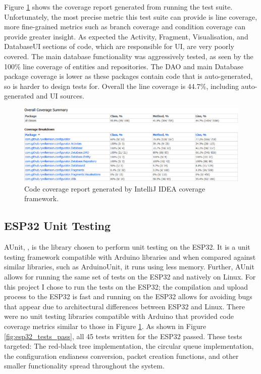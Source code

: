 \documentclass{l4proj}
\begin{document}
Figure \ref{fig:android_coverage} shows the coverage report generated from running the test suite. Unfortunately, the most precise metric this test suite can provide is line coverage, more fine-grained metrics such as branch coverage and condition coverage can provide greater insight. As expected the Activity, Fragment, Visualisation, and DatabaseUI sections of code, which are responsible for UI, are very poorly covered. The main database functionality was aggressively tested, as seen by the 100\% line coverage of entities and repositories. The DAO and main Database package coverage is lower as these packages contain code that is auto-generated, so is harder to design tests for. Overall the line coverage is 44.7\%, including auto-generated and UI sources.

\begin{figure}[!htb]
    \centering
    \includegraphics[width=1.0\linewidth]{images/android-code-coverage.png}

    \caption{ Code coverage report generated by IntelliJ IDEA coverage framework. }

    \label{fig:android_coverage}
\end{figure}

\subsection{ESP32 Unit Testing}

AUnit, \citep{park_bxparksaunit_2021}, is the library chosen to perform unit testing on the ESP32. It is a unit testing framework compatible with Arduino libraries and when compared against similar libraries, such as ArduinoUnit, it runs using less memory. Further, AUnit allows for running the same set of tests on the ESP32 and natively on Linux. For this project I chose to run the tests on the ESP32; the compilation and upload process to the ESP32 is fast and running on the ESP32 allows for avoiding bugs that appear due to architectural differences between ESP32 and Linux. There were no unit testing libraries compatible with Arduino that provided code coverage metrics similar to those in Figure \ref{fig:android_coverage}. As shown in Figure \ref{fig:esp32_tests_pass}, all 45 tests written for the ESP32 passed. These tests targeted: The red-black tree implementation, the circular queue implementation, the configuration endianess conversion, packet creation functions, and other smaller functionality spread throughout the system.
\end{document}
